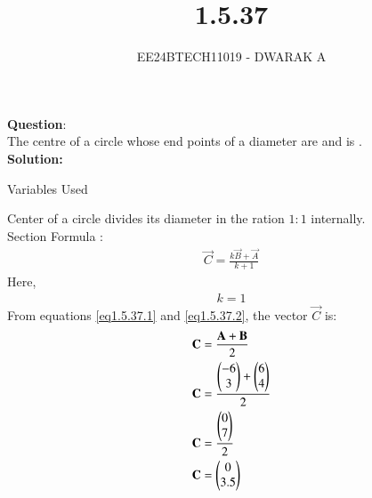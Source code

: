 \documentclass[journal]{IEEEtran}
\begin{document}

\vspace{3cm}

\title{1.5.37}
\author{EE24BTECH11019 - DWARAK A}
{\let\newpage\relax\maketitle}

\renewcommand{\thefigure}{\theenumi}
\renewcommand{\thetable}{\theenumi}
\setlength{\intextsep}{10pt} %


\renewcommand{\thetable}{\theenumi}


\textbf{Question}:
\\
The centre of a circle whose end points of a diameter are  and  is \underline{\hspace{1cm}} .
\\

\textbf{Solution: }
\begin{table}[h!]    
  \centering
  
  \caption{Variables Used}
  \label{tab1.5.37.1}
\end{table}

Center of a circle divides its diameter in the ration $1:1$ internally.\\

Section Formula :
\begin{align}
    \vec{C}=\frac{k\vec{B}+\vec{A}}{k+1}\label{eq1.5.37.1}
\end{align}
Here,
\begin{align}
    k=1\label{eq1.5.37.2}
\end{align}
From  equations \ref{eq1.5.37.1} and \ref{eq1.5.37.2}, the vector $\vec{C}$ is:
\begin{align}
    \mathbf{C}&=\frac{\mathbf{A}+\mathbf{B}}{2}\\
    \mathbf{C}&=\frac{\begin{pmatrix}-6\\3\end{pmatrix}+\begin{pmatrix}6\\4\end{pmatrix}}{2}\\
    \mathbf{C}&=\frac{\begin{pmatrix}0\\7\end{pmatrix}}{2}\\
    \mathbf{C}&=\begin{pmatrix}0\\3.5\end{pmatrix}
\end{align}
\end{document}
